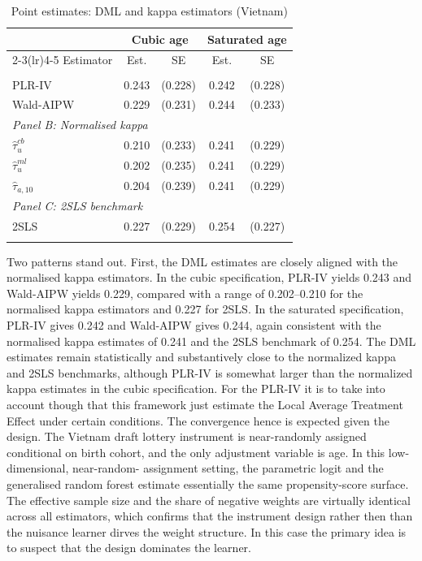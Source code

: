\documentclass[12pt, a4paper, oneside]{article}
\theoremstyle{plain}
\theoremstyle{definition}
\begin{document}
\begin{table}[htbp]
\centering
\caption{Point estimates: DML and kappa estimators (Vietnam)}
\label{tab:vietnam_dml}
\small
\begin{tabular}{l cc cc}
\toprule
 & \multicolumn{2}{c}{Cubic age}
 & \multicolumn{2}{c}{Saturated age} \\
\cmidrule(lr){2-3}\cmidrule(lr){4-5}
Estimator & Est. & SE & Est. & SE \\
\midrule
\addlinespace[2pt]
\multicolumn{5}{l}{\textit{Panel A: DML}} \\[2pt]
PLR-IV           & 0.243 & (0.228) & 0.242 & (0.228) \\
Wald-AIPW        & 0.229 & (0.231) & 0.244 & (0.233) \\[4pt]
\multicolumn{5}{l}{\textit{Panel B: Normalised kappa}} \\[2pt]
$\hat{\tau}_{u}^{cb}$   & 0.210 & (0.233) & 0.241 & (0.229) \\
$\hat{\tau}_{u}^{ml}$   & 0.202 & (0.235) & 0.241 & (0.229) \\
$\hat{\tau}_{a,10}$     & 0.204 & (0.239) & 0.241 & (0.229) \\[4pt]
\multicolumn{5}{l}{\textit{Panel C: 2SLS benchmark}} \\[2pt]
2SLS             & 0.227 & (0.229) & 0.254 & (0.227) \\
\bottomrule
\addlinespace[4pt]
\end{tabular}
\end{table}
 Two patterns stand out. First, the DML estimates are closely aligned
with the normalised kappa estimators. In the cubic specification, PLR-IV
yields 0.243 and Wald-AIPW yields 0.229, compared with a range of
0.202--0.210 for the normalised kappa estimators and 0.227 for 2SLS.
In the saturated specification, PLR-IV gives 0.242 and Wald-AIPW gives
0.244, again consistent with the normalised kappa estimates of 0.241 and
the 2SLS benchmark of 0.254.
The DML estimates remain statistically and substantively close to the normalized kappa and 2SLS benchmarks, although PLR-IV is somewhat larger than the normalized kappa estimates in the cubic specification. For the PLR-IV it is to take into account though that this framework just estimate the Local Average Treatment Effect under certain conditions. 
The convergence hence is expected given the design. The Vietnam draft lottery
instrument is near-randomly assigned conditional on birth cohort, and the
only adjustment variable is age. In this low-dimensional, near-random-
assignment setting, the parametric logit and the generalised random forest
estimate essentially the same propensity-score surface.
 The effective sample size and the share of negative weights are virtually identical across all estimators, which confirms that the instrument design rather then than the nuisance learner dirves the weight structure. In this case the primary idea is to suspect that the design dominates the learner. 
\end{document}
